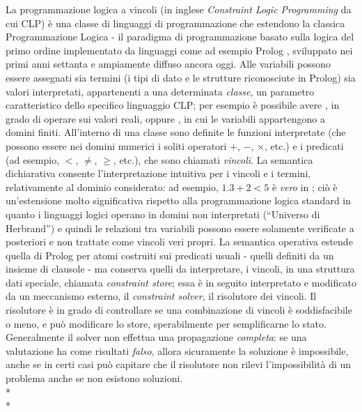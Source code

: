 La programmazione logica a vincoli \cite{clpSurvey} (in inglese \emph{Constraint Logic Programming} da cui CLP) è una classe di linguaggi di programmazione che estendono la classica Programmazione Logica - il paradigma di programmazione basato sulla logica del primo ordine implementato da linguaggi come ad esempio Prolog \cite{Colmerauer,Kowalski,clocksin2003programming}, sviluppato nei primi anni settanta e ampiamente diffuso ancora oggi. Alle variabili possono essere assegnati sia termini (i tipi di dato e le strutture riconosciute in Prolog) sia valori interpretati, appartenenti a una determinata \emph{classe}, un parametro caratteristico dello specifico linguaggio CLP; per esempio è possibile avere \clpr \cite{clpR}, in grado di operare sui valori reali, oppure \clpfd, in cui le variabili appartengono a domini finiti. All'interno di una classe sono definite le funzioni interpretate (che possono essere nei domini numerici i soliti operatori $+$, $-$, $\times$, etc.) e i predicati (ad esempio, $<$, $\neq$, $\geq$, etc.), che sono chiamati \emph{vincoli}. La semantica dichiarativa consente l'interpretazione intuitiva per i vincoli e i termini, relativamente al dominio considerato: ad esempio, $1.3+2<5$ è \emph{vero} in \clpr; ciò è un'estensione molto significativa rispetto alla programmazione logica standard in quanto i linguaggi logici operano in domini non interpretati (``Universo di Herbrand'') e quindi le relazioni tra variabili possono essere solamente verificate a posteriori e non trattate come vincoli veri propri. La semantica operativa estende quella di Prolog per atomi costruiti sui predicati usuali - quelli definiti da un insieme di clausole - ma conserva quelli da interpretare, i vincoli, in una struttura dati speciale, chiamata \emph{constraint store}; essa è in seguito interpretato e modificato da un meccanismo esterno, il \emph{constraint solver}, il risolutore dei vincoli. Il risolutore è in grado di controllare se una combinazione di vincoli è soddisfacibile o meno, e può modificare lo store, sperabilmente per semplificarne lo stato. Generalmente il solver non effettua una propagazione \emph{completa}: se una valutazione ha come risultati \emph{falso}, allora sicuramente la soluzione è impossibile, anche se in certi casi può capitare che il risolutore non rilevi l'impossibilità di un problema anche se non esistono soluzioni.\\*\\*  
